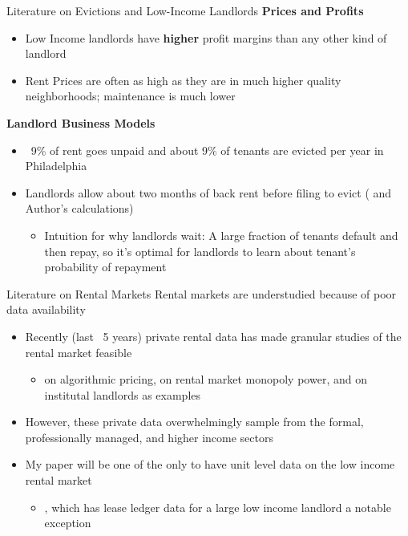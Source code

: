 \documentclass[10pt, xcolor=dvipsnames]{beamer}
\begin{document}

\begin{frame}{Literature on Evictions and Low-Income Landlords}
    \textbf{Prices and Profits}
        \begin{itemize}
                \item Low Income landlords have \textbf{higher} profit margins than any other kind of landlord \parencite{Desmond_2019, Damen_2025, Eisfeldt_2015}
                \item Rent Prices are often as high as they are in much higher quality neighborhoods; maintenance is much lower 
        \end{itemize}
    \pause 
    \textbf{Landlord Business Models}
    \begin{itemize}
        \item ~9\% of rent goes unpaid \parencite{collinson2024eviction} and about 9\% of tenants are evicted per year in Philadelphia
        \item Landlords allow about two months of back rent before filing to evict (\cite{collinson2024eviction} and Author's calculations)
        \begin{itemize}
            \item Intuition for why landlords wait: A large fraction of tenants default and then repay, so it's optimal for landlords to learn about tenant's probability of repayment
        \end{itemize}
    \end{itemize}
    
\end{frame}

\begin{frame}{Literature on Rental Markets}
    Rental markets are understudied because of poor data availability\\
    \vspace{0.25cm}
    \begin{itemize}
        \item Recently (last ~5 years) private rental data has made granular studies of the rental market feasible
        \begin{itemize}
            \item \cite{calderwang2024algorithmic} on algorithmic pricing, \cite{framoutar2024market} on rental market monopoly power, and \cite{gurun-et-al-2022} on institutal landlords as examples
        \end{itemize}
        \item However, these private data overwhelmingly sample from the formal, professionally managed, and higher income sectors
        \item My paper will be one of the only to have unit level data on the low income rental market
        \begin{itemize}
            \item \cite{humphries-2024}, which has lease ledger data for a large low income landlord a notable exception
        \end{itemize}
    \end{itemize}
\end{frame}
\end{document}
